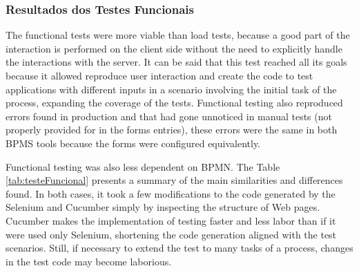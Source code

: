 \documentclass[runningheads,a4paper]{llncs}
\begin{document}
\subsubsection{Resultados dos Testes Funcionais}
The functional tests were more viable than load tests, because a good part of the interaction is performed on the client side without the need to explicitly handle the interactions with the server. It can be said that this test reached all its goals because it allowed reproduce user interaction and create the code to test applications with different inputs in a scenario involving the initial task of the process, expanding the coverage of the tests. Functional testing also reproduced errors found in production and that had gone unnoticed in manual tests (not properly provided for in the forms entries), these errors were the same in both BPMS tools because the forms were configured equivalently.


Functional testing was also less dependent on BPMN. The Table \ref{tab:testeFuncional} presents a summary of the main similarities and differences found. In both cases, it took a few modifications to the code generated by the Selenium and Cucumber simply by inspecting the structure of Web pages. Cucumber makes the implementation of testing faster and less labor than if it were used only Selenium, shortening the code generation aligned with the test scenarios. Still, if necessary to extend the test to many tasks of a process, changes in the test code may become laborious.
\end{document}

